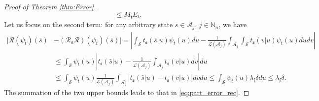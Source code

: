 \documentclass{LMCS}
\begin{document}
\begin{proof}[Proof of Theorem \ref{thm:Error}]
\begin{equation*}
\le M_{\mathfrak f} E_t.
\end{equation*}
Let us focus on the second term: 
for any arbitrary state $\bar s\in\mathcal A_j$, $j\in\mathbb N_n$, we have 
\begin{align*}
|\mathcal R(\psi_t)(\bar s)&-(\mathcal R_a\mathcal R )(\psi_t)(\bar s)|
= \left|\int_{\mathcal S}t_{\mathfrak s}(\bar s|u)\psi_t(u)du - \frac{1}{\mathcal L(\mathcal A_j)}\int_{\mathcal A_j}\int_{\mathcal S}t_{\mathfrak s}(v|u)\psi_t(u)du dv\right|\\
& \le \int_{\mathcal S}\psi_t(u)\left|t_{\mathfrak s}(\bar s|u)-\frac{1}{\mathcal L(\mathcal A_j)}\int_{\mathcal A_j}t_{\mathfrak s}(v|u)dv\right|du\\
& \le \int_{\mathcal S}\psi_t(u)\frac{1}{\mathcal L(\mathcal A_j)}\int_{\mathcal A_j}\left|t_{\mathfrak s}(\bar s|u)-t_{\mathfrak s}(v|u)\right|dv du
\le \int_{\mathcal S}\psi_t(u) \lambda_{\mathfrak f}\delta du \le \lambda_{\mathfrak f}\delta.
\end{align*}
The summation of the two upper bounds leads to that in \eqref{eq:part_error_rec}.
\end{proof}
\end{document}
